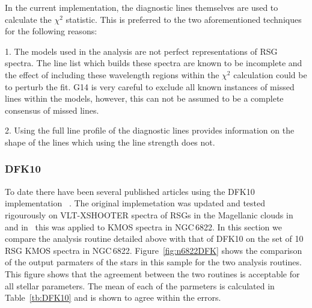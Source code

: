 In the current implementation, the diagnostic lines themselves are used to calculate the $\chi^{2}$ statistic.
This is preferred to the two aforementioned techniques for the following reasons:

1. The models used in the analysis are not perfect representations of RSG spectra.
The line list which builds these spectra are known to be incomplete and the effect of including these wavelength regions within the $\chi^{2}$ calculation could be to perturb the fit. G14 is very careful to exclude all known instances of missed lines within the models, however, this can not be assumed to be a complete consensus of missed lines.

2. Using the full line profile of the diagnostic lines provides information on the shape of the lines which using the line strength does not.

\subsubsection{DFK10} %
\label{sub:dfk10}
To date there have been several published articles using the DFK10 implementation
~\citep{2010MNRAS.407.1203D,2015ApJ...803...14P,2015ApJ...806...21D}.
The original implemetation was updated and tested rigourously on VLT-XSHOOTER spectra of RSGs in the Magellanic clouds in
~\cite{2015ApJ...806...21D} and in~\cite{2015ApJ...803...14P} this was applied to KMOS spectra in NGC\,6822.
In this section we compare the analysis routine detailed above with that of DFK10 on the set of 10 RSG KMOS spectra in NGC\,6822.
Figure~\ref{fig:n6822DFK} shows the comparison of the output parmaters of the stars in this sample for the two analysis routines.
This figure shows that the agreement between the two routines is acceptable for all stellar parameters.
The mean of each of the parmeters is calculated in Table~\ref{tb:DFK10} and is shown to agree within the errors.

